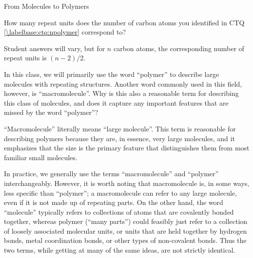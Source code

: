 \begin{activity}{From Molecules to Polymers}
\begin{exercises}
	\exercise How many repeat units does the number of carbon atoms you identified in CTQ \ref{\labelbase:ctq:npolymer} correspond to?
	
		\begin{solution}{}
		
			Student answers will vary, but for $n$ carbon atoms, the corresponding number of repeat units is $(n-2)/2$.
			
		\end{solution}

	\exercise In this class, we will primarily use the word ``polymer'' to describe large molecules with repeating structures.  Another word commonly used in this field, however, is ``macromolecule''.  Why is this also a reasonable term for describing this class of molecules, and does it capture any important features that are missed by the word ``polymer''?
	
		\begin{solution}{}
			``Macromolecule'' literally means ``large molecule''.  This term is reasonable for describing polymers because they are, in essence, very large molecules, and it emphasizes that the size is the primary feature that distinguishes them from most familiar small molecules.
			
			In practice, we generally use the terms ``macromolecule'' and ``polymer'' interchangeably.  However, it is worth noting that macromolecule is, in some ways, less specific than ``polymer''; a macromolecule can refer to any large molecule, even if it is not made up of repeating parts.  On the other hand, the word ``molecule'' typically refers to collections of atoms that are covalently bonded together, whereas polymer (``many parts'') could feasibly just refer to a collection of loosely associated molecular units, or units that are held together by hydrogen bonds, metal coordination bonds, or other types of non-covalent bonds.  Thus the two terms, while getting at many of the same ideas, are not strictly identical.
		\end{solution}
	
\end{exercises}



	


	
\end{activity}